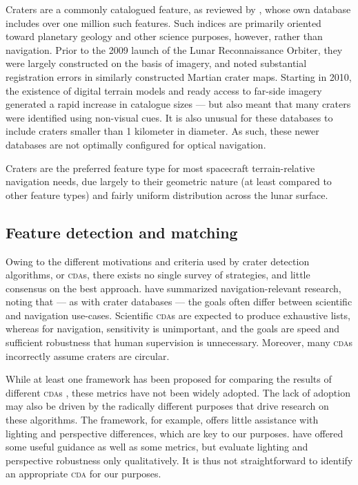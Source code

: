 \documentclass[12pt]{olfmemo}
\begin{document}
Craters are a commonly catalogued feature, as reviewed by \citet{Robbins2019}, whose own database includes over one million such features. Such indices are primarily oriented toward planetary geology and other science purposes, however, rather than navigation. Prior to the 2009 launch of the Lunar Reconnaissance Orbiter, they were largely constructed on the basis of imagery, and \citet{Salamuniccar2008} noted substantial registration errors in similarly constructed Martian crater maps. Starting in 2010, the existence of digital terrain models and ready access to far-side imagery generated a rapid increase in catalogue sizes --- but also meant that many craters were identified using non-visual cues. It is also unusual for these databases to include craters smaller than 1 kilometer in diameter. As such, these newer databases are not optimally configured for optical navigation.

Craters are the preferred feature type for most spacecraft terrain-relative navigation needs, due largely to their geometric nature (at least compared to other feature types) and fairly uniform distribution across the lunar surface.

\subsection{Feature detection and matching}
Owing to the different motivations and criteria used by crater detection algorithms, or \textsc{cda}s, there exists no single survey of strategies, and little consensus on the best approach. \citet{Christian2020} have summarized navigation-relevant research, noting that --- as with crater databases --- the goals often differ between scientific and navigation use-cases. Scientific \textsc{cda}s are expected to produce exhaustive lists, whereas for navigation, sensitivity is unimportant, and the goals are speed and sufficient robustness that human supervision is unnecessary. Moreover, many \textsc{cda}s incorrectly assume craters are circular.

While at least one framework has been proposed for comparing the results of different \textsc{cda}s \citep{Salamuniccar2008}, these metrics have not been widely adopted. The lack of adoption may also be driven by the radically different purposes that drive research on these algorithms. The \citet{Salamuniccar2008} framework, for example, offers little assistance with lighting and perspective differences, which are key to our purposes. \citet{Woicke2018} have offered some useful guidance as well as some metrics, but evaluate lighting and perspective robustness only qualitatively. It is thus not straightforward to identify an appropriate \textsc{cda} for our purposes.
\end{document}
